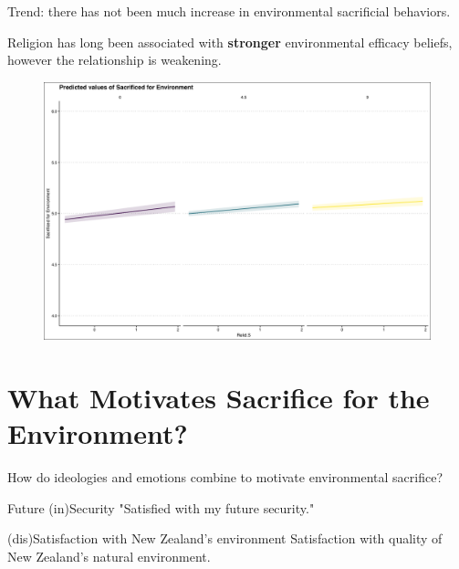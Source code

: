 \documentclass{beamer}
\begin{document}
\begin{frame}{Trend: there has not been much increase in environmental sacrificial behaviors.}
\begin{frame}{Religion has long been associated with {\bf stronger} environmental efficacy beliefs, however the relationship is weakening.}
\begin{figure}
\includegraphics[width=.8\textwidth,height=\textheight,keepaspectratio]{Figures/SACRIFICEMADE_RELIDS_T.png}
\end{figure}
\end{frame}

\section{What Motivates Sacrifice for the Environment?}
\begin{frame}{How do ideologies and emotions combine to motivate environmental sacrifice?}
    

\begin{alertblock}{Future (in)Security}
"Satisfied with my future security."
\end{alertblock}


\begin{alertblock}{(dis)Satisfaction with New Zealand's environment}
Satisfaction with quality of New Zealand’s natural environment.
\end{alertblock}


\end{frame}



\end{frame}
\end{document}
